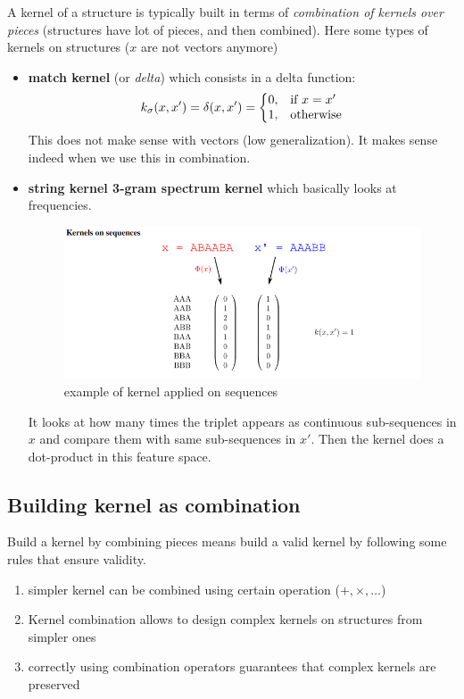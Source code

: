 A kernel of a structure is typically built in terms of \textit{combination of
kernels over pieces} (structures have lot of pieces, and then combined). Here some
types of kernels on structures ($x$ are not vectors anymore)
\begin{itemize}
	\item \textbf{match kernel} (or \textit{delta}) which consists in a delta function:
		\begin{equation}
			k_{\sigma}(x, x') = \delta(x, x') =\left\{
			\begin{array}{@{}ll@{}}
				0, & \text{if}\ x=x'  \\
				1, & \text{otherwise}
			\end{array}\right.
		\end{equation}
		This does not make sense with vectors (low generalization). It makes sense indeed
		when we use this in combination.

	\item \textbf{string kernel 3-gram spectrum kernel} which basically looks at
		frequencies.
		\begin{figure}[H]
			\centering
			\includegraphics[scale=0.5]{
                images/15_KernelMachines_stringKernel.png
            }
			\caption{example of kernel applied on sequences}
			\label{fig:string_kernel}
		\end{figure}
		It looks at how many times the triplet appears as continuous sub-sequences in
		$x$ and compare them with same sub-sequences in $x'$. Then the kernel does a
		dot-product in this feature space.
\end{itemize}

\subsection{Building kernel as combination}
Build a kernel by combining pieces means build a valid kernel by following some
rules that ensure validity.
\begin{enumerate}
	\item simpler kernel can be combined using certain operation ($+, \times, \dots$)

	\item Kernel combination allows to design complex kernels on structures from simpler
		ones

	\item correctly using combination operators guarantees that complex kernels are
		preserved
\end{enumerate}

